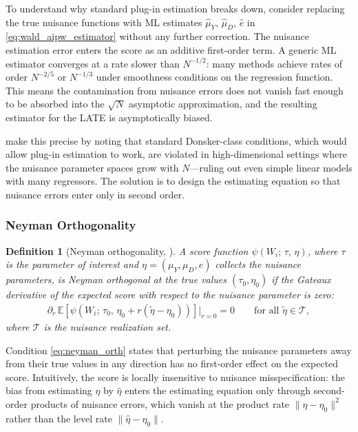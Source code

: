 \documentclass[12pt,a4paper]{article}
\newtheorem{definition}{Definition}
\newcommand{\E}{\mathbb{E}}
\begin{document}
To understand why standard plug-in estimation breaks down, consider replacing the true
nuisance functions with ML estimates $\hat{\mu}_Y$, $\hat{\mu}_D$, $\hat{e}$ in
\eqref{eq:wald_aipw_estimator} without any further correction. The nuisance estimation
error enters the score as an additive first-order term. A generic ML estimator converges
at a rate slower than $N^{-1/2}$: many methods achieve rates of order $N^{-2/5}$ or
$N^{-1/3}$ under smoothness conditions on the regression function. This means the
contamination from nuisance errors does not vanish fast enough to be absorbed into the
$\sqrt{N}$ asymptotic approximation, and the resulting estimator for the LATE is
asymptotically biased.
 
\citet[p.\ C8]{chernozhukov2018double} make this precise by noting that standard
Donsker-class conditions, which would allow plug-in estimation to work, are violated in
high-dimensional settings where the nuisance parameter spaces grow with $N$---ruling out
even simple linear models with many regressors. The solution is to design the estimating
equation so that nuisance errors enter only in second order.
 
\subsubsection{Neyman Orthogonality}
\label{subsubsec:neyman_orth}
 
\begin{definition}[Neyman orthogonality, \citealp{chernozhukov2018double}]
\label{def:neyman_orth}
A score function $\psi(W_i;\, \tau,\, \eta)$, where $\tau$ is the parameter of interest
and $\eta = (\mu_Y, \mu_D, e)$ collects the nuisance parameters, is \emph{Neyman
orthogonal} at the true values $(\tau_0, \eta_0)$ if the Gateaux derivative of the
expected score with respect to the nuisance parameter is zero:
\begin{align}
    \partial_r\,
    \E\!\left[\psi\!\left(W_i;\, \tau_0,\, \eta_0 + r(\tilde\eta - \eta_0)\right)\right]
    \Big|_{r=0}
    = 0
    \qquad
    \text{for all } \tilde\eta \in \mathcal{T},
    \label{eq:neyman_orth}
\end{align}
where $\mathcal{T}$ is the nuisance realization set.
\end{definition}
 
Condition \eqref{eq:neyman_orth} states that perturbing the nuisance parameters away
from their true values in any direction has no first-order effect on the expected score.
Intuitively, the score is locally insensitive to nuisance misspecification: the bias from
estimating $\eta$ by $\hat\eta$ enters the estimating equation only through
second-order products of nuisance errors, which vanish at the product rate
$\|\hat\eta - \eta_0\|^2$ rather than the level rate $\|\hat\eta - \eta_0\|$.
 
\end{document}
